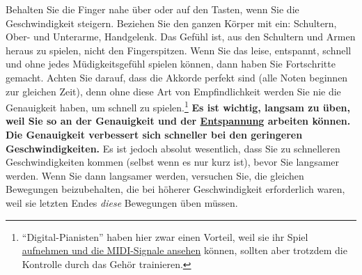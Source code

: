 Behalten Sie die Finger nahe über oder auf den Tasten, wenn Sie die Geschwindigkeit steigern.
Beziehen Sie den ganzen Körper mit ein: Schultern, Ober- und Unterarme, Handgelenk.
Das Gefühl ist, aus den Schultern und Armen heraus zu spielen, nicht den Fingerspitzen.
Wenn Sie das leise, entspannt, schnell und ohne jedes Müdigkeitsgefühl spielen können, dann haben Sie Fortschritte gemacht.
Achten Sie darauf, dass die Akkorde perfekt sind (alle Noten beginnen zur gleichen Zeit), denn ohne diese Art von Empfindlichkeit werden Sie nie die Genauigkeit haben, um schnell zu spielen.\footnote{\enquote{Digital-Pianisten} haben hier zwar einen Vorteil, weil sie ihr Spiel \hyperref[c1iii13MIDI]{aufnehmen und die MIDI-Signale ansehen} können, sollten aber trotzdem die Kontrolle durch das Gehör trainieren.}
\textbf{Es ist wichtig, langsam zu üben, weil Sie so an der Genauigkeit und der \hyperref[c1ii14]{Entspannung} arbeiten können.
Die Genauigkeit verbessert sich schneller bei den geringeren Geschwindigkeiten.}
Es ist jedoch absolut wesentlich, dass Sie zu schnelleren Geschwindigkeiten kommen (selbst wenn es nur kurz ist), bevor Sie langsamer werden.
Wenn Sie dann langsamer werden, versuchen Sie, die gleichen Bewegungen beizubehalten, die bei höherer Geschwindigkeit erforderlich waren, weil sie letzten Endes \textit{diese} Bewegungen üben müssen.



